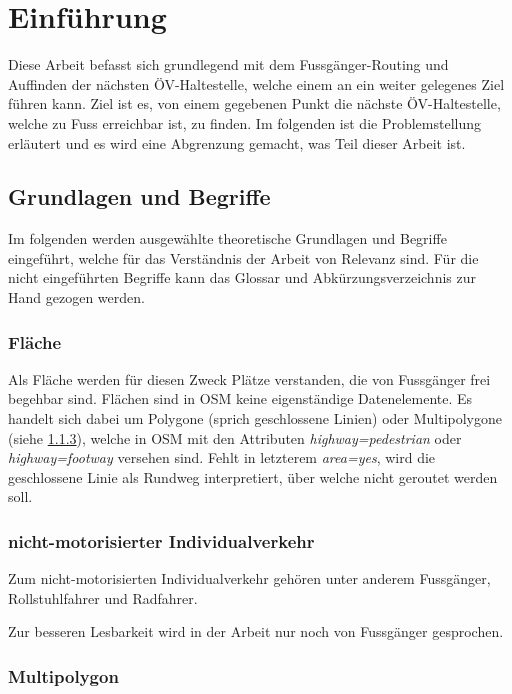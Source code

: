 \section{Einführung}
\label{Einführung}
Diese Arbeit befasst sich grundlegend mit dem Fussgänger-Routing und Auffinden der nächsten ÖV-Haltestelle, welche einem an ein weiter gelegenes Ziel führen kann. Ziel ist es, von einem gegebenen Punkt die nächste ÖV-Haltestelle, welche zu Fuss erreichbar ist, zu finden. Im folgenden ist die Problemstellung erläutert und es wird eine Abgrenzung gemacht, was Teil dieser Arbeit ist.

\subsection{Grundlagen und Begriffe}
\label{Grundlagen und Begriffe}

Im folgenden werden ausgewählte theoretische Grundlagen und Begriffe eingeführt, welche für das Verständnis der Arbeit von Relevanz sind. Für die nicht eingeführten Begriffe kann das Glossar und Abkürzungsverzeichnis zur Hand gezogen werden.

\subsubsection{Fläche}
\label{Fläche}

Als Fläche werden für diesen Zweck Plätze verstanden, die von Fussgänger frei begehbar sind. Flächen sind in \ac{OSM} keine eigenständige Datenelemente. Es handelt sich dabei um Polygone (sprich geschlossene Linien) oder Multipolygone (siehe \ref{Multipolygon}), welche in \ac{OSM} mit den Attributen \textit{highway=pedestrian} oder \textit{highway=footway} versehen sind. Fehlt in letzterem \textit{area=yes}, wird die geschlossene Linie als Rundweg interpretiert, über welche nicht geroutet werden soll. \cite{osm_wiki_area}

\subsubsection{nicht-motorisierter Individualverkehr}
\label{nicht-motorisierter Individualverkehr}

Zum nicht-motorisierten Individualverkehr gehören unter anderem Fussgänger, Rollstuhlfahrer und Radfahrer.

Zur besseren Lesbarkeit wird in der Arbeit nur noch von Fussgänger gesprochen.

\subsubsection{Multipolygon}
\label{Multipolygon}


